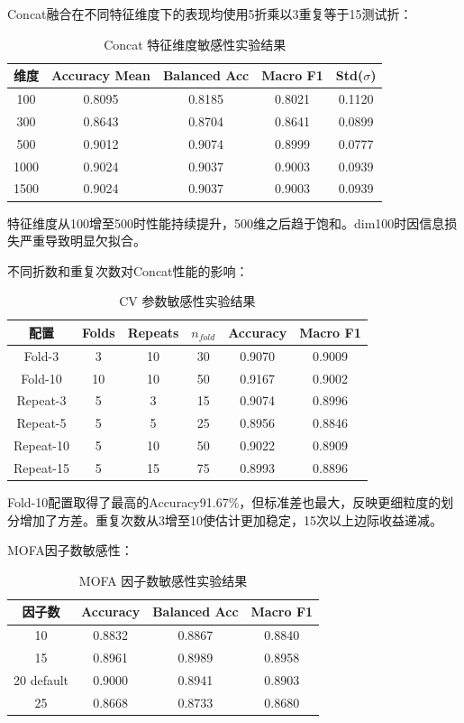 Concat融合在不同特征维度下的表现均使用5折乘以3重复等于15测试折：

\begin{table}[H]
\centering
\caption{Concat 特征维度敏感性实验结果}
\label{tab:dim-sensitivity}
\begin{tabular}{ccccc}
\toprule
维度 & Accuracy Mean & Balanced Acc & Macro F1 & Std($\sigma$) \\
\midrule
100 & 0.8095 & 0.8185 & 0.8021 & 0.1120 \\
300 & 0.8643 & 0.8704 & 0.8641 & 0.0899 \\
500 & 0.9012 & 0.9074 & 0.8999 & 0.0777 \\
1000 & 0.9024 & 0.9037 & 0.9003 & 0.0939 \\
1500 & 0.9024 & 0.9037 & 0.9003 & 0.0939 \\
\bottomrule
\end{tabular}
\end{table}

特征维度从100增至500时性能持续提升，500维之后趋于饱和。dim100时因信息损失严重导致明显欠拟合。

不同折数和重复次数对Concat性能的影响：

\begin{table}[H]
\centering
\caption{CV 参数敏感性实验结果}
\label{tab:cv-sensitivity}
\begin{tabular}{cccccc}
\toprule
配置 & Folds & Repeats & $n_{fold}$ & Accuracy & Macro F1 \\
\midrule
Fold-3 & 3 & 10 & 30 & 0.9070 & 0.9009 \\
Fold-10 & 10 & 10 & 50 & 0.9167 & 0.9002 \\
Repeat-3 & 5 & 3 & 15 & 0.9074 & 0.8996 \\
Repeat-5 & 5 & 5 & 25 & 0.8956 & 0.8846 \\
Repeat-10 & 5 & 10 & 50 & 0.9022 & 0.8909 \\
Repeat-15 & 5 & 15 & 75 & 0.8993 & 0.8896 \\
\bottomrule
\end{tabular}
\end{table}

Fold-10配置取得了最高的Accuracy91.67\%，但标准差也最大，反映更细粒度的划分增加了方差。重复次数从3增至10使估计更加稳定，15次以上边际收益递减。

MOFA因子数敏感性：

\begin{table}[H]
\centering
\caption{MOFA 因子数敏感性实验结果}
\label{tab:mofa-sensitivity}
\begin{tabular}{cccc}
\toprule
因子数 & Accuracy & Balanced Acc & Macro F1 \\
\midrule
10 & 0.8832 & 0.8867 & 0.8840 \\
15 & 0.8961 & 0.8989 & 0.8958 \\
20 default & 0.9000 & 0.8941 & 0.8903 \\
25 & 0.8668 & 0.8733 & 0.8680 \\
\bottomrule
\end{tabular}
\end{table}


